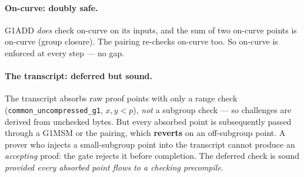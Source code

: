 \paragraph{On-curve: doubly safe.}
G1ADD \emph{does} check on-curve on its inputs, and the sum of
two on-curve points is on-curve (group closure). The pairing
re-checks on-curve too. So on-curve is enforced at every step ---
no gap.

\paragraph{The transcript: deferred but sound.}
The transcript absorbs raw proof points with only a range check
(\texttt{common\_\allowbreak{}uncompressed\_\allowbreak{}g1}, $x,y < p$), \emph{not} a
subgroup check --- so challenges are derived from unchecked bytes.
But every absorbed point is subsequently passed through a G1MSM
or the pairing, which \textbf{reverts} on an off-subgroup point.
A prover who injects a small-subgroup point into the transcript
cannot produce an \emph{accepting} proof: the gate rejects it
before completion. The deferred check is sound \emph{provided
every absorbed point flows to a checking precompile}.

